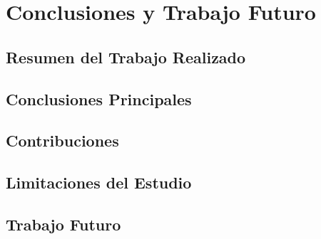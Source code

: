 
\chapter{Conclusiones y Trabajo Futuro}

\section{Resumen del Trabajo Realizado}

\section{Conclusiones Principales}

\section{Contribuciones}

\section{Limitaciones del Estudio}

\section{Trabajo Futuro}
